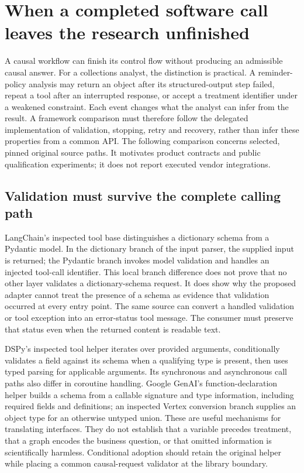 \section[Framework delegates and scientific completion]{When a completed software call leaves the research unfinished}
\label{sec:exec28-dl}
A causal workflow can finish its control flow without producing an admissible causal answer.
For a collections analyst, the distinction is practical. A reminder-policy analysis may return an
object after its structured-output step failed, repeat a tool after an interrupted response, or
accept a treatment identifier under a weakened constraint. Each event changes what the analyst can
infer from the result. A framework comparison must therefore follow the delegated implementation
of validation, stopping, retry and recovery, rather than infer these properties from a common API.
The following comparison concerns selected, pinned original source paths. It motivates product
contracts and public qualification experiments; it does not report executed vendor integrations.

\subsection{Validation must survive the complete calling path}
LangChain's inspected tool base distinguishes a dictionary schema from a Pydantic model. In the
dictionary branch of the input parser, the supplied input is returned; the Pydantic branch invokes
model validation and handles an injected tool-call identifier. This local branch difference does
not prove that no other layer validates a dictionary-schema request. It does show why the proposed
adapter cannot treat the presence of a schema as evidence that validation occurred at every entry
point. The same source can convert a handled validation or tool exception into an error-status tool
message. The consumer must preserve that status even when the returned content is readable text.
\citep{exec28_dl_langchain}

DSPy's inspected tool helper iterates over provided arguments, conditionally validates a field
against its schema when a qualifying type is present, then uses typed parsing for applicable
arguments. Its synchronous and asynchronous call paths also differ in coroutine handling. Google
GenAI's function-declaration helper builds a schema from a callable signature and type information,
including required fields and definitions; an inspected Vertex conversion branch supplies an
object type for an otherwise untyped union. These are useful mechanisms for translating interfaces.
They do not establish that a variable precedes treatment, that a graph encodes the business question,
or that omitted information is scientifically harmless. Conditional adoption should retain the
original helper while placing a common causal-request validator at the library boundary.
\citep{exec28_dl_dspy,exec28_dl_google}

